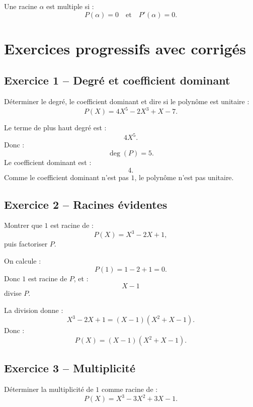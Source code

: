 \documentclass[11pt,a4paper]{article}
\begin{document}
\begin{erreurbox}
Une racine \(\alpha\) est multiple si :
\[
P(\alpha)=0
\quad\text{et}\quad
P'(\alpha)=0.
\]
\end{erreurbox}

\newpage
\section{Exercices progressifs avec corrigés}

\subsection*{Exercice 1 -- Degré et coefficient dominant}

\begin{exercicebox}
Déterminer le degré, le coefficient dominant et dire si le polynôme est unitaire :
\[
P(X)=4X^5-2X^3+X-7.
\]
\end{exercicebox}

\begin{correctionbox}
Le terme de plus haut degré est :
\[
4X^5.
\]
Donc :
\[
\deg(P)=5.
\]
Le coefficient dominant est :
\[
4.
\]
Comme le coefficient dominant n'est pas \(1\), le polynôme n'est pas unitaire.
\end{correctionbox}

\subsection*{Exercice 2 -- Racines évidentes}

\begin{exercicebox}
Montrer que \(1\) est racine de :
\[
P(X)=X^3-2X+1,
\]
puis factoriser \(P\).
\end{exercicebox}

\begin{correctionbox}
On calcule :
\[
P(1)=1-2+1=0.
\]
Donc \(1\) est racine de \(P\), et :
\[
X-1
\]
divise \(P\).

La division donne :
\[
X^3-2X+1=(X-1)(X^2+X-1).
\]
Donc :
\[
P(X)=(X-1)(X^2+X-1).
\]
\end{correctionbox}

\subsection*{Exercice 3 -- Multiplicité}

\begin{exercicebox}
Déterminer la multiplicité de \(1\) comme racine de :
\[
P(X)=X^3-3X^2+3X-1.
\]
\end{exercicebox}
\end{document}
